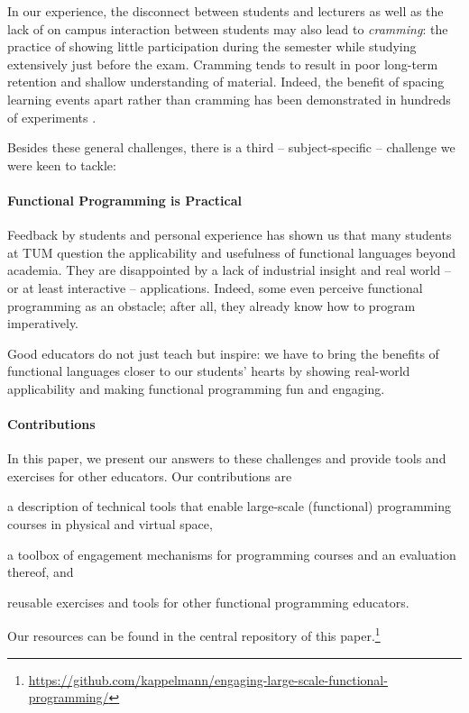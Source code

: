 In our experience, the disconnect between students and lecturers as well as the lack of on campus interaction between students may also lead to \emph{cramming}:
the practice of showing little participation during the semester
while studying extensively just before the exam.
Cramming tends to result in poor long-term retention and shallow understanding of material.
Indeed, the benefit of spacing learning events apart rather than cramming has been demonstrated in hundreds of experiments \cite{cramming1,cramming2}.

\vspace{\baselineskip}\noindent
Besides these general challenges,
there is a third -- subject-specific --
challenge we were keen to tackle:

\paragraph{Functional Programming is Practical}
Feedback by students and personal experience has shown us that many students
at TUM question the applicability and usefulness
of functional languages beyond academia.
They are disappointed by a lack of industrial insight
and real world -- or at least interactive -- applications.
Indeed, some even perceive functional programming as an obstacle;
after all, they already know how to program imperatively.

Good educators do not just teach but inspire:
we have to bring the benefits of functional languages
closer to our students' hearts
by showing real-world applicability and making functional programming fun and engaging.

\paragraph{Contributions}

In this paper,
we present our answers to these challenges
and provide tools and exercises for other educators.
Our contributions are
\begin{enumerate*}[label=\arabic*)]
  \item a description of technical tools that enable large-scale (functional) programming courses in physical and virtual space,
  \item a toolbox of engagement mechanisms
for programming courses
and an evaluation thereof, and
  \item reusable exercises and tools for other functional programming educators.
\end{enumerate*}
Our resources can be found in the central repository of this paper.\footnote{\url{https://github.com/kappelmann/engaging-large-scale-functional-programming/}}

